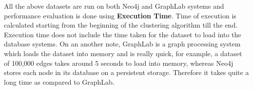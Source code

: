 All the above datasets are run on both Neo4j and GraphLab systems and performance evaluation is done using \textbf{Execution Time}. Time of execution is calculated starting from the beginning of the clustering algorithm till the end. \\
Execution time does not include the time taken for the dataset to load into the database systems. On an another note, GraphLab is a graph processing system which loads the dataset into memory and is really quick, for example, a dataset of 100,000 edges takes around 5 seconds to load into memory, whereas Neo4j stores each node in its database on a persistent storage. Therefore it takes quite a long time as compared to GraphLab.